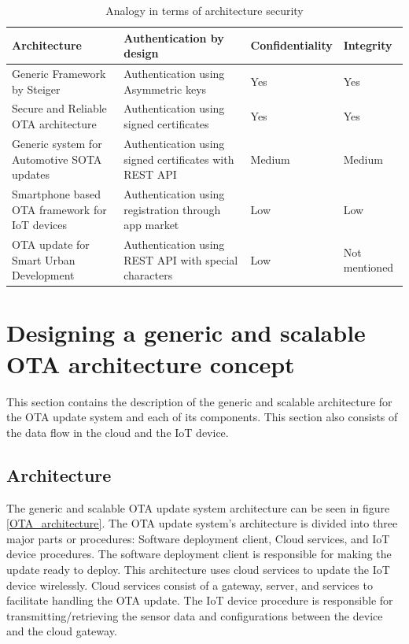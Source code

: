 \documentclass[12pt,a4paper]{article}
\begin{document}
{\begin{table}[h]
\footnotesize
\centering
\begin{tabular}{ |p{4cm}||p{3cm}|p{2.5cm}|p{2.5cm}|}
 \hline
 Architecture & Authentication by design  & Confidentiality & Integrity \\
 \hline
 Generic Framework by Steiger & Authentication using Asymmetric keys & Yes & Yes\\
 \hline
  Secure and Reliable OTA architecture & Authentication using signed certificates & Yes & Yes\\
 \hline
  Generic system for Automotive SOTA updates & Authentication using signed certificates with REST API & Medium & Medium\\
 \hline
  Smartphone based OTA framework for IoT devices & Authentication using registration through app market & Low & Low\\
 \hline
 OTA update for Smart Urban Development & Authentication using REST API with special characters & Low & Not mentioned\\
 \hline
\end{tabular}
\caption{Analogy in terms of architecture security}
\label{analogy_security}
\end{table}




\newpage

\renewcommand{\baselinestretch}{1.5} %
\section{Designing a generic and scalable OTA architecture concept}

This section contains the description of the generic and scalable architecture for the OTA update system and each of its components. This section also consists of the data flow in the cloud and the IoT device.

\subsection{Architecture}

The generic and scalable OTA update system architecture can be seen in figure \ref{OTA_architecture}. The OTA update system's architecture is divided into three major parts or procedures: Software deployment client, Cloud services, and IoT device procedures. The software deployment client is responsible for making the update ready to deploy. This architecture uses cloud services to update the IoT device wirelessly. Cloud services consist of a gateway, server, and services to facilitate handling the OTA update. The IoT device procedure is responsible for transmitting/retrieving the sensor data and configurations between the device and the cloud gateway. 

}
\end{document}
